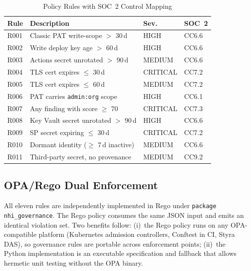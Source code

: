 \documentclass[journal]{IEEEtran}
\begin{document}
\begin{table}[t]
  \centering
  \caption{Policy Rules with SOC~2 Control Mapping}
  \label{tab:rules}
  \setlength{\tabcolsep}{3pt}
  \footnotesize
  \begin{tabular}{@{}llll@{}}
    \toprule
    \textbf{Rule} & \textbf{Description} & \textbf{Sev.} & \textbf{SOC~2} \\
    \midrule
    R001 & Classic PAT write-scope $>$ 30\,d           & HIGH     & CC6.6 \\
    R002 & Write deploy key age $>$ 60\,d              & HIGH     & CC6.6 \\
    R003 & Actions secret unrotated $>$ 90\,d          & MEDIUM   & CC6.6 \\
    R004 & TLS cert expires $\leq$ 30\,d              & CRITICAL & CC7.2 \\
    R005 & TLS cert expires $\leq$ 60\,d              & MEDIUM   & CC7.2 \\
    R006 & PAT carries \texttt{admin:org} scope        & HIGH     & CC6.1 \\
    R007 & Any finding with score $\geq$ 70            & CRITICAL & CC7.3 \\
    R008 & Key Vault secret unrotated $>$ 90\,d        & HIGH     & CC6.6 \\
    R009 & SP secret expiring $\leq$ 30\,d            & CRITICAL & CC7.2 \\
    R010 & Dormant identity ($\geq$ 7\,d inactive)    & MEDIUM   & CC6.6 \\
    R011 & Third-party secret, no provenance           & MEDIUM   & CC9.2 \\
    \bottomrule
  \end{tabular}
\end{table}

\subsection{OPA/Rego Dual Enforcement}

All eleven rules are independently implemented in Rego under \texttt{package nhi\_governance}. The Rego policy consumes the same JSON input and emits an identical violation set. Two benefits follow: (i)~the Rego policy runs on any OPA-compatible platform (Kubernetes admission controllers, Conftest in CI, Styra DAS), so governance rules are portable across enforcement points; (ii)~the Python implementation is an executable specification and fallback that allows hermetic unit testing without the OPA binary.
\end{document}
